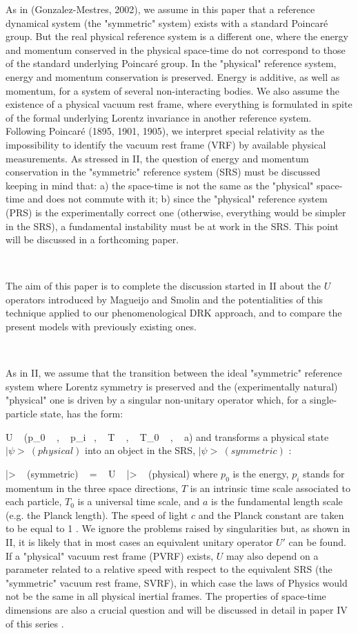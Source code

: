 \documentclass[a4paper,12pt,dvips]{article}
\begin{document}
As in (Gonzalez-Mestres, 2002), we assume in this paper that a reference dynamical system (the "symmetric" system) exists with a standard Poincar\'e group. But the real physical reference system is a different one, where the energy and momentum conserved in the physical space-time do not correspond to those of the standard underlying Poincar\'e group. In the "physical" reference system, energy and momentum conservation is preserved. Energy is additive, as well as momentum, for a system of several non-interacting bodies. We also assume the existence of a physical vacuum rest frame, where everything is formulated in spite of the formal underlying Lorentz invariance in another reference system. Following Poincar\'e (1895, 1901, 1905), we interpret special relativity as the impossibility to identify the vacuum rest frame (VRF) by available physical measurements. As stressed in II, the question of energy and momentum conservation in the "symmetric" reference system (SRS) must be discussed keeping in mind that: a) the space-time is not the same as the "physical" space-time and does not commute with it; b) since the "physical" reference system (PRS) is the experimentally correct one (otherwise, everything would be simpler in the SRS), a fundamental instability must be at work in the SRS. This point will be discussed in a forthcoming paper.


~

The aim of this paper is to complete the discussion started in II about the $U$ operators introduced by Magueijo and Smolin and the potentialities of this technique applied to our phenomenological DRK approach, and to compare the present models with previously existing ones.


~

As in II, we assume that the transition between the ideal "symmetric" reference system where Lorentz symmetry is preserved and the (experimentally natural) "physical" one is driven by a singular non-unitary operator which, for a single-particle state, has the form:

\equation
U ~ (p_0 ~ , ~ p_i ~, ~ T ~ , ~ T_0 ~ , ~ a) 
\endequation
\noindent
and transforms a physical state $|\psi> ~ (physical)$ into an object in the SRS, $|\psi> ~ (symmetric)$ :

\equation
|\psi> ~ (symmetric) ~ = ~ U ~ |\psi> ~ (physical)
\endequation
\noindent
where $p_0$ is the energy, $p_i$ stands for momentum in the three space directions, $T$ is an intrinsic time scale associated to each particle, $T_0$ is a universal time scale, and $a$ is the fundamental length scale (e.g. the Planck length). The speed of light $c$ and the Planck constant are taken to be equal to 1 . We ignore the problems raised by singularities but, as shown in II, it is likely that in most cases an equivalent unitary operator $U'$ can be found. If a "physical" vacuum rest frame (PVRF) exists, $U$ may also depend on a parameter related to a relative speed with respect to the equivalent SRS (the "symmetric" vacuum rest frame, SVRF), in which case the laws of Physics would not be the same in all physical inertial frames. The properties of space-time dimensions are also a crucial question and will be discussed in detail in paper IV of this series .
\end{document}
